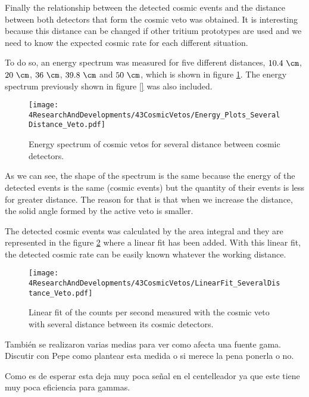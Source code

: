 Finally the relationship between the detected cosmic events and the distance between both detectors that form the cosmic veto was obtained. It is interesting because this distance can be changed if other tritium prototypes are used and we need to know the expected cosmic rate for each different situation.

To do so, an energy spectrum was measured for five different distances, $10.4~\cm$, $20~\cm$, $36~\cm$, $39.8~\cm$ and $50~\cm$, which is shown in figure \ref{fig:EnergySpectrumsSeveralDistanceVeto}. The energy spectrum previously shown in figure \ref{} was also included. 

\begin{figure}[h]
\centering
\texttt{[image: 4ResearchAndDevelopments/43CosmicVetos/Energy\_Plots\_SeveralDistance\_Veto.pdf]}
\caption{Energy spectrum of cosmic vetos for several distance between cosmic detectors.\label{fig:EnergySpectrumsSeveralDistanceVeto}}
\end{figure}

As we can see, the shape of the spectrum is the same because the energy of the detected events is the same (cosmic events) but the quantity of their events is less for greater distance. The reason for that is that when we increase the distance, the solid angle formed by the active veto is smaller.

The detected cosmic events was calculated by the area integral and they are represented in the figure \ref{fig:LinearFitSeveralDistanceVeto} where a linear fit has been added. With this linear fit, the detected cosmic rate can be easily known whatever the working distance. 

\begin{figure}[h]
\centering
\texttt{[image: 4ResearchAndDevelopments/43CosmicVetos/LinearFit\_SeveralDistance\_Veto.pdf]}
\caption{Linear fit of the counts per second measured with the cosmic veto with several distance between its cosmic detectors.\label{fig:LinearFitSeveralDistanceVeto}}
\end{figure}





También se realizaron varias medias para ver como afecta una fuente gama. Discutir con Pepe como plantear esta medida o si merece la pena ponerla o no.

Como es de esperar esta deja muy poca señal en el centelleador ya que este tiene muy poca eficiencia para gammas.